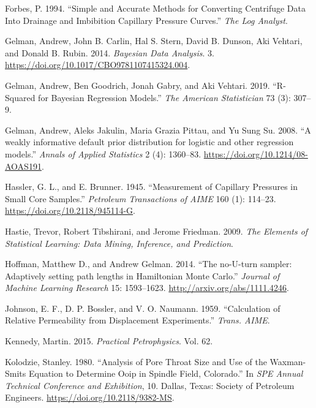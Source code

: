 \documentclass[english,msc,numbers]{coppe}
\begin{document}
  \leavevmode\hypertarget{ref-Forbes1994}{}%
  Forbes, P. 1994. ``Simple and Accurate Methods for Converting Centrifuge Data Into Drainage and Imbibition Capillary Pressure Curves.'' \emph{The Log Analyst}.
  
  \leavevmode\hypertarget{ref-Gelman2014}{}%
  Gelman, Andrew, John B. Carlin, Hal S. Stern, David B. Dunson, Aki Vehtari, and Donald B. Rubin. 2014. \emph{Bayesian Data Analysis}. 3. \url{https://doi.org/10.1017/CBO9781107415324.004}.
  
  \leavevmode\hypertarget{ref-GelmanGoodrich2019}{}%
  Gelman, Andrew, Ben Goodrich, Jonah Gabry, and Aki Vehtari. 2019. ``R-Squared for Bayesian Regression Models.'' \emph{The American Statistician} 73 (3): 307--9.
  
  \leavevmode\hypertarget{ref-Gelman2008}{}%
  Gelman, Andrew, Aleks Jakulin, Maria Grazia Pittau, and Yu Sung Su. 2008. ``A weakly informative default prior distribution for logistic and other regression models.'' \emph{Annals of Applied Statistics} 2 (4): 1360--83. \url{https://doi.org/10.1214/08-AOAS191}.
  
  \leavevmode\hypertarget{ref-Hassler1945}{}%
  Hassler, G. L., and E. Brunner. 1945. ``Measurement of Capillary Pressures in Small Core Samples.'' \emph{Petroleum Transactions of AIME} 160 (1): 114--23. \url{https://doi.org/10.2118/945114-G}.
  
  \leavevmode\hypertarget{ref-Hastie2009}{}%
  Hastie, Trevor, Robert Tibshirani, and Jerome Friedman. 2009. \emph{The Elements of Statistical Learning: Data Mining, Inference, and Prediction}.
  
  \leavevmode\hypertarget{ref-Hoffman2014}{}%
  Hoffman, Matthew D., and Andrew Gelman. 2014. ``The no-U-turn sampler: Adaptively setting path lengths in Hamiltonian Monte Carlo.'' \emph{Journal of Machine Learning Research} 15: 1593--1623. \url{http://arxiv.org/abs/1111.4246}.
  
  \leavevmode\hypertarget{ref-Johnson1959}{}%
  Johnson, E. F., D. P. Bossler, and V. O. Naumann. 1959. ``Calculation of Relative Permeability from Displacement Experiments.'' \emph{Trans. AIME}.
  
  \leavevmode\hypertarget{ref-Kennedy2015}{}%
  Kennedy, Martin. 2015. \emph{Practical Petrophysics}. Vol. 62.
  
  \leavevmode\hypertarget{ref-Kolodzie1980}{}%
  Kolodzie, Stanley. 1980. ``Analysis of Pore Throat Size and Use of the Waxman-Smits Equation to Determine Ooip in Spindle Field, Colorado.'' In \emph{SPE Annual Technical Conference and Exhibition}, 10. Dallas, Texas: Society of Petroleum Engineers. \url{https://doi.org/10.2118/9382-MS}.
  
\end{document}
